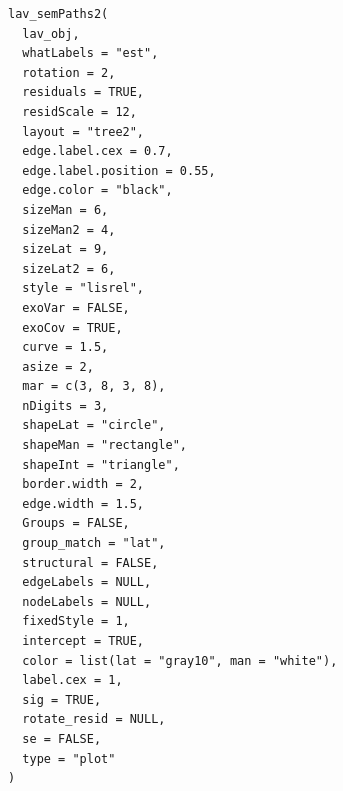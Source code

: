 \documentclass[a4paper]{book}
\begin{document}
\begin{Usage}
\begin{verbatim}
lav_semPaths2(
  lav_obj,
  whatLabels = "est",
  rotation = 2,
  residuals = TRUE,
  residScale = 12,
  layout = "tree2",
  edge.label.cex = 0.7,
  edge.label.position = 0.55,
  edge.color = "black",
  sizeMan = 6,
  sizeMan2 = 4,
  sizeLat = 9,
  sizeLat2 = 6,
  style = "lisrel",
  exoVar = FALSE,
  exoCov = TRUE,
  curve = 1.5,
  asize = 2,
  mar = c(3, 8, 3, 8),
  nDigits = 3,
  shapeLat = "circle",
  shapeMan = "rectangle",
  shapeInt = "triangle",
  border.width = 2,
  edge.width = 1.5,
  Groups = FALSE,
  group_match = "lat",
  structural = FALSE,
  edgeLabels = NULL,
  nodeLabels = NULL,
  fixedStyle = 1,
  intercept = TRUE,
  color = list(lat = "gray10", man = "white"),
  label.cex = 1,
  sig = TRUE,
  rotate_resid = NULL,
  se = FALSE,
  type = "plot"
)
\end{verbatim}
\end{Usage}
%
\end{document}
